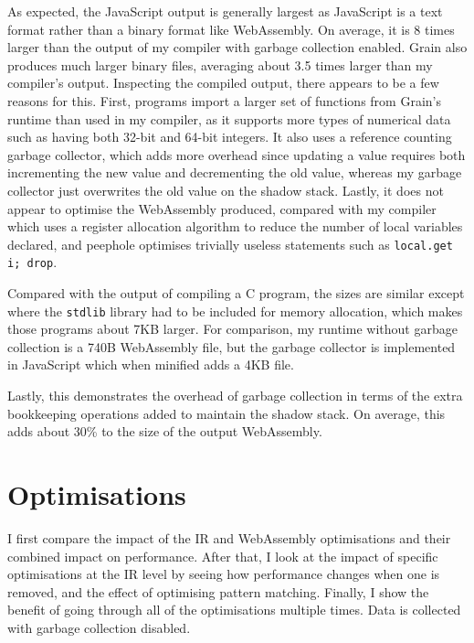 As expected, the JavaScript output is generally largest as JavaScript is a text format rather than a binary format like WebAssembly. On average, it is 8 times larger than the output of my compiler with garbage collection enabled. Grain also produces much larger binary files, averaging about 3.5 times larger than my compiler's output. Inspecting the compiled output, there appears to be a few reasons for this. First, programs import a larger set of functions from Grain's runtime than used in my compiler, as it supports more types of numerical data such as having both 32-bit and 64-bit integers. It also uses a reference counting garbage collector, which adds more overhead since updating a value requires both incrementing the new value and decrementing the old value, whereas my garbage collector just overwrites the old value on the shadow stack. Lastly, it does not appear to optimise the WebAssembly produced, compared with my compiler which uses a register allocation algorithm to reduce the number of local variables declared, and peephole optimises trivially useless statements such as \verb|local.get i; drop|.

Compared with the output of compiling a C program, the sizes are similar except where the \verb|stdlib| library had to be included for memory allocation, which makes those programs about 7KB larger. For comparison, my runtime without garbage collection is a 740B WebAssembly file, but the garbage collector is implemented in JavaScript which when minified adds a 4KB file.

Lastly, this demonstrates the overhead of garbage collection in terms of the extra bookkeeping operations added to maintain the shadow stack. On average, this adds about 30\% to the size of the output WebAssembly.

\section{Optimisations}

I first compare the impact of the IR and WebAssembly optimisations and their combined impact on performance. After that, I look at the impact of specific optimisations at the IR level by seeing how performance changes when one is removed, and the effect of optimising pattern matching. Finally, I show the benefit of going through all of the optimisations multiple times. %
Data is collected with garbage collection disabled. %

